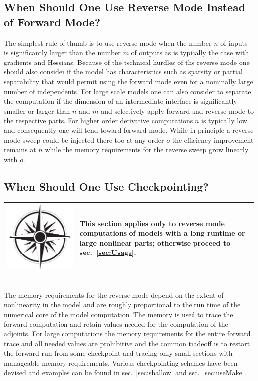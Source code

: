 \documentclass{book}
\newcommand{\refsec}[1]{{sec.~\ref{#1}}}
\newcommand{\nav}[1]{
\begin{tabular}{|m{.03\textwidth}|m{.92\textwidth}|}\hline
\vspace{1mm}
\includegraphics[width=.03\textwidth]{windrose_zh1}&
\vspace{1mm}
\begin{minipage}[c]{.86\textwidth}
\small {#1}
\end{minipage}
\vspace{1mm}
\\\hline
\end{tabular}
}
\begin{document}
\subsection{When Should One Use Reverse Mode Instead of Forward Mode?}\label{sec:reverseInsteadOfForward}
The simplest rule of thumb is to use reverse mode when the number $n$ of inputs is significantly larger than the 
number $m$  of outputs as is typically the case with gradients and Hessians. 
Because of the technical hurdles of the reverse mode one should also consider if the model 
has characteristics such as sparsity or  partial separability that would permit using the forward mode 
even for a nominally large number of independents. 
For large scale models one can also consider to separate the computation if the dimension 
of an intermediate interface is significantly smaller or larger than $n$ and $m$ 
and selectively apply forward and reverse mode to the respective parts. For higher order derivative 
computations $n$ is typically low and consequently one will tend toward 
forward mode. While in principle a reverse mode sweep could be injected there too at any order $o$ 
the efficiency improvement remains at $n$ while the memory requirements for the reverse sweep 
grow linearly with $o$.

\subsection{When Should One Use Checkpointing?}\label{sec:Checkpointing}
\nav{This section applies only to reverse mode computations of models with a long runtime or large  
nonlinear parts; otherwise proceed to \refsec{sec:Usage}.}\\[1ex]
The memory requirements for the reverse mode depend on the extent of nonlinearity in the model 
and are roughly proportional to the run time of the numerical core of the model computation.
The memory is used to trace the forward  computation and retain values needed for the computation 
of the adjoints. 
For large computations the memory requirements for the entire forward trace and all needed 
values are prohibitive and the common tradeoff is to restart the forward run from 
some checkpoint and tracing only small sections with manageable memory requirements. 
Various checkpointing schemes have been devised and examples can be found in \refsec{sec:shallow} 
and \refsec{sec:useMake}. 
\end{document}
